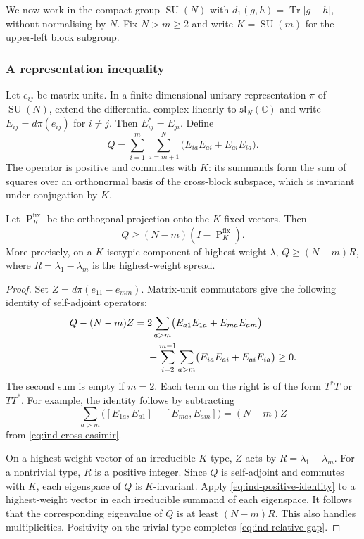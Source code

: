 We now work in the compact group $\operatorname{SU}(N)$ with
$d_1(g,h)=\operatorname{Tr}\lvert g-h\rvert$, without normalising by $N$. Fix $N>m\ge2$
and write $K=\operatorname{SU}(m)$ for the upper-left block subgroup.


\subsubsection{A representation inequality}

Let $e_{ij}$ be matrix units. In a finite-dimensional unitary
representation $\pi$ of $\operatorname{SU}(N)$, extend the differential complex
linearly to $\mathfrak{sl}_N(\mathbb C)$ and write
$E_{ij}=d\pi(e_{ij})$ for $i\ne j$. Then
$E_{ij}^*=E_{ji}$. Define
\begin{equation}\label{eq:ind-cross-casimir}
Q=\sum_{i=1}^m\sum_{a=m+1}^N
\bigl(E_{ia}E_{ai}+E_{ai}E_{ia}\bigr).
\end{equation}
The operator is positive and commutes with $K$: its summands form the
sum of squares over an orthonormal basis of the cross-block subspace,
which is invariant under conjugation by $K$.

\begin{lemma}\label{lem:ind-relative-gap}
Let $\operatorname{P}^{\mathrm{fix}}_K$ be the orthogonal projection onto the $K$-fixed vectors.
Then
\begin{equation}\label{eq:ind-relative-gap}
Q\ge(N-m)(I-\operatorname{P}^{\mathrm{fix}}_K).
\end{equation}
More precisely, on a $K$-isotypic component of highest weight
$\lambda$, $Q\ge(N-m)R$, where
$R=\lambda_1-\lambda_m$ is the highest-weight spread.
\end{lemma}

\begin{proof}
Set $Z=d\pi(e_{11}-e_{mm})$. Matrix-unit commutators give the
following identity of self-adjoint operators:
\begin{align}\label{eq:ind-positive-identity}
Q-(N-m)Z
={}&2\sum_{a>m}\bigl(E_{a1}E_{1a}+E_{ma}E_{am}\bigr)\notag\\
&+\sum_{i=2}^{m-1}\sum_{a>m}
\bigl(E_{ia}E_{ai}+E_{ai}E_{ia}\bigr)\ge0.
\end{align}
The second sum is empty if $m=2$. Each term on the right is of the
form $T^*T$ or $TT^*$. For example, the identity follows by subtracting
\[
\sum_{a>m}\bigl([E_{1a},E_{a1}]-[E_{ma},E_{am}]\bigr)=(N-m)Z
\]
from \eqref{eq:ind-cross-casimir}.

On a highest-weight vector of an irreducible $K$-type, $Z$ acts by
$R=\lambda_1-\lambda_m$. For a nontrivial type, $R$ is a positive
integer. Since $Q$ is self-adjoint and commutes with $K$, each
eigenspace of $Q$ is $K$-invariant. Apply
\eqref{eq:ind-positive-identity} to a highest-weight vector in each
irreducible summand of each eigenspace. It follows that the
corresponding eigenvalue of $Q$ is at least $(N-m)R$. This also
handles multiplicities. Positivity on the trivial type completes
\eqref{eq:ind-relative-gap}.
\end{proof}



